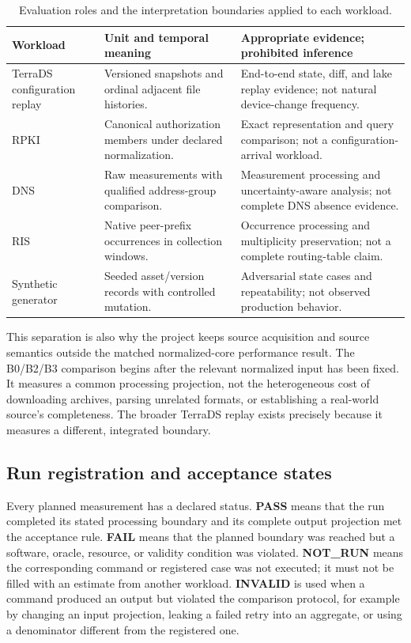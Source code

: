 \begin{table}[ht]
\centering
\caption{Evaluation roles and the interpretation boundaries applied to each workload.}
\label{tab:evidence-roles}
\small
\begin{tabularx}{\textwidth}{p{}p{}X}
\toprule
Workload & Unit and temporal meaning & Appropriate evidence; prohibited inference \\
\midrule
TerraDS configuration replay & Versioned snapshots and ordinal adjacent file histories. & End-to-end state, diff, and lake replay evidence; not natural device-change frequency. \\
RPKI & Canonical authorization members under declared normalization. & Exact representation and query comparison; not a configuration-arrival workload. \\
DNS & Raw measurements with qualified address-group comparison. & Measurement processing and uncertainty-aware analysis; not complete DNS absence evidence. \\
RIS & Native peer-prefix occurrences in collection windows. & Occurrence processing and multiplicity preservation; not a complete routing-table claim. \\
Synthetic generator & Seeded asset/version records with controlled mutation. & Adversarial state cases and repeatability; not observed production behavior. \\
\bottomrule
\end{tabularx}
\end{table}

This separation is also why the project keeps source acquisition and source semantics outside the matched normalized-core performance result. The B0/B2/B3 comparison begins after the relevant normalized input has been fixed. It measures a common processing projection, not the heterogeneous cost of downloading archives, parsing unrelated formats, or establishing a real-world source's completeness. The broader TerraDS replay exists precisely because it measures a different, integrated boundary.

\subsection{Run registration and acceptance states}

Every planned measurement has a declared status. \textbf{PASS} means that the run completed its stated processing boundary and its complete output projection met the acceptance rule. \textbf{FAIL} means that the planned boundary was reached but a software, oracle, resource, or validity condition was violated. \textbf{NOT\_RUN} means the corresponding command or registered case was not executed; it must not be filled with an estimate from another workload. \textbf{INVALID} is used when a command produced an output but violated the comparison protocol, for example by changing an input projection, leaking a failed retry into an aggregate, or using a denominator different from the registered one.


